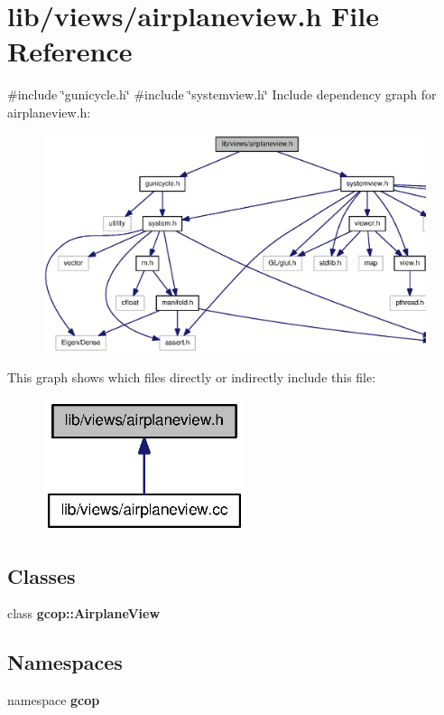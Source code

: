\section{lib/views/airplaneview.h \-File \-Reference}
\label{airplaneview_8h}
{\ttfamily \#include \char`\"{}gunicycle.\-h\char`\"{}}\*
{\ttfamily \#include \char`\"{}systemview.\-h\char`\"{}}\*
\-Include dependency graph for airplaneview.\-h\-:
\nopagebreak
\begin{figure}[H]
\begin{center}
\leavevmode
\includegraphics[width=350pt]{airplaneview_8h__incl}
\end{center}
\end{figure}
\-This graph shows which files directly or indirectly include this file\-:
\nopagebreak
\begin{figure}[H]
\begin{center}
\leavevmode
\includegraphics[width=168pt]{airplaneview_8h__dep__incl}
\end{center}
\end{figure}
\subsection*{\-Classes}
\begin{DoxyCompactItemize}
\item 
class {\bf gcop\-::\-Airplane\-View}
\end{DoxyCompactItemize}
\subsection*{\-Namespaces}
\begin{DoxyCompactItemize}
\item 
namespace {\bf gcop}
\end{DoxyCompactItemize}
